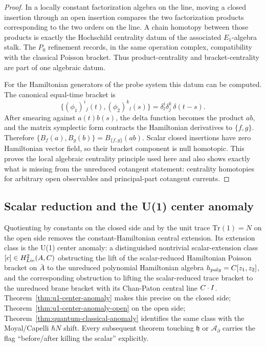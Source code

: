 \documentclass[11pt]{memoir}
\begin{document}
\begin{proof}
  In a locally constant factorization algebra on the line, moving a
  closed insertion through an open insertion compares the two
  factorization products corresponding to the two orders on the line. A
  chain homotopy between those products is exactly the Hochschild
  centrality datum of the associated \(E_1\)-algebra stalk. The \(P_0\)
  refinement records, in the same operation complex, compatibility with
  the classical Poisson bracket. Thus product-centrality and
  bracket-centrality are part of one algebraic datum.

  For the Hamiltonian generators of the probe system this datum can be
  computed. The canonical equal-time bracket is
  \[
    \{(\phi_1)^i{}_j(t),(\phi_2)^k{}_l(s)\}
      =\delta^i_l\delta^k_j\,\delta(t-s).
  \]
  After smearing against \(a(t)b(s)\), the delta function becomes the
  product \(ab\), and the matrix symplectic form contracts the
  Hamiltonian derivatives to \(\{f,g\}\). Therefore
  \(\{B_f(a),B_g(b)\}=B_{\{f,g\}}(ab)\). Scalar closed insertions have
  zero Hamiltonian vector field, so their bracket component is null
  homotopic. This proves the local algebraic centrality principle used
  here and also shows exactly what is missing from the unreduced
  cotangent statement: centrality homotopies for arbitrary open
  observables and principal-part cotangent currents.
\end{proof}

\subsection{Scalar reduction and the U(1) center anomaly}\label{subsec:scalar-anomaly}

Quotienting by constants on the closed side and by the unit trace
$\mathrm{Tr}(1)=N$ on the open side removes the
constant-Hamiltonian central extension. Its extension class is the U(1)
center anomaly: a distinguished nontrivial scalar-extension class
$[c]\in H^2_{Lie}(A, C)$ obstructing the lift of
the scalar-reduced Hamiltonian Poisson bracket on $\bar A$ to the
unreduced polynomial Hamiltonian algebra
$h_{poly}=C[z_1,z_2]$, and the corresponding
obstruction to lifting the scalar-reduced trace bracket to the unreduced
brane bracket with its Chan-Paton central line $C\cdot I$.
Theorem~\ref{thm:u1-center-anomaly} makes this precise on the closed
side; Theorem~\ref{thm:u1-center-anomaly-open} on the open side;
Theorem~\ref{thm:quantum-classical-anomaly} identifies the same class
with the Moyal/Capelli $\hbar N$ shift. Every subsequent theorem
touching $\mathfrak h$ or $\mathcal A_{\partial}$ carries the flag
``before/after killing the scalar'' explicitly.
\end{document}
